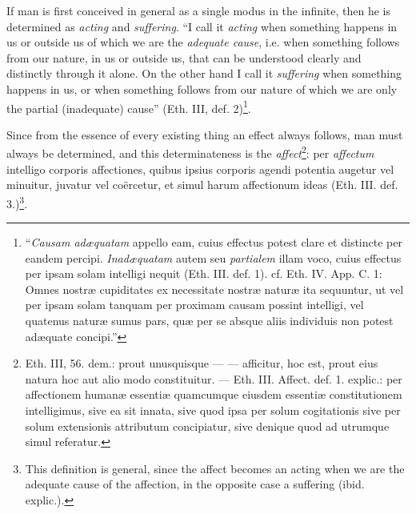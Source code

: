 \documentclass[12pt,a4paper,openany]{book}
\newcommand{\opage}[1]{\marginnote{\footnotesize\textit{[#1]}}}
\begin{document}
If man is first conceived in general as a single
modus in the infinite, then he is determined as \emph{acting}
and \emph{suffering}. ``I call it \emph{acting} when something happens
in us or outside us of which we are the \emph{adequate cause},
\opage{111}\setcounter{footnote}{0}i.e. when something follows from our nature, in us or outside
us, that can be understood clearly and distinctly through it alone. On the other
hand I call it \emph{suffering} when something happens in us,
or when something follows from our nature of which we are only
the partial (inadequate) cause'' (Eth. III, def.
2)\footnote{``\emph{Causam adæquatam} appello eam, cuius effectus
potest clare et distincte per eandem percipi. \emph{Inadæquatam}
autem seu \emph{partialem} illam voco, cuius effectus per ipsam
solam intelligi nequit (Eth. III. def. 1). cf. Eth. IV. App. C.
1: Omnes nostræ cupiditates ex necessitate nostræ naturæ ita
sequuntur, ut vel per ipsam solam tanquam per proximam
causam possint intelligi, vel quatenus naturæ sumus pars,
quæ per se absque aliis individuis non potest adæquate
concipi.''}. %

Since from the essence of every existing thing an effect always
follows, man must always be determined, and
this determinateness is the \emph{affect}\footnote{Eth. III, 56. dem.:
prout unusquisque --- --- afficitur, hoc est, prout eius natura
hoc aut alio modo constituitur. --- Eth. III. Affect. def. 1.
explic.: per affectionem humanæ essentiæ quamcumque
eiusdem essentiæ constitutionem intelligimus, sive ea sit
innata, sive quod ipsa per solum cogitationis sive per solum
extensionis attributum concipiatur, sive denique quod ad
utrumque simul referatur.}: per \emph{affectum} intelligo corporis
affectiones, quibus ipsius corporis agendi potentia augetur
vel minuitur, juvatur vel coërcetur, et simul harum
affectionum ideas (Eth. III. def.
3.)\footnote{This definition is general, since the affect
becomes an acting when we are the adequate cause of the
affection, in the opposite case a suffering (ibid. explic.).}.
\end{document}
